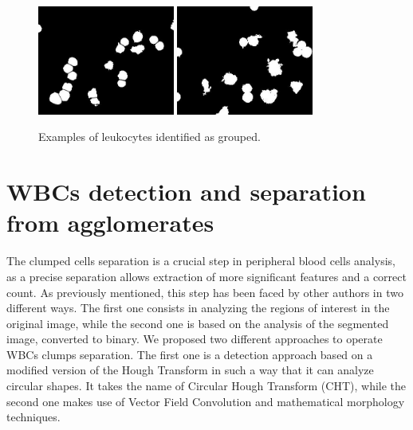 {	\begin{figure}[ht]
		\centering
		\includegraphics[width=0.4\textwidth]{images/Fig12-1}
		\includegraphics[width=0.4\textwidth]{images/Fig12-2}
		\caption[Grouped leukocytes.]{\label{fig:example10}Examples of leukocytes identified as grouped.}
	\end{figure}
	
	\section{WBCs detection and separation from agglomerates} %
	The clumped cells separation is a crucial step in peripheral blood cells analysis, as a precise separation allows extraction of more significant features and a correct count. As previously mentioned, this step has been faced by other authors in two different ways. The first one consists in analyzing the regions of interest in the original image, while the second one is based on the analysis of the segmented image, converted to binary. We proposed two different approaches to operate WBCs clumps separation. The first one is a detection approach based on a modified version of the Hough Transform in such a way that it can analyze circular shapes. It takes the name of Circular Hough Transform (CHT), while the second one makes use of Vector Field Convolution and mathematical morphology techniques. 
	
}

